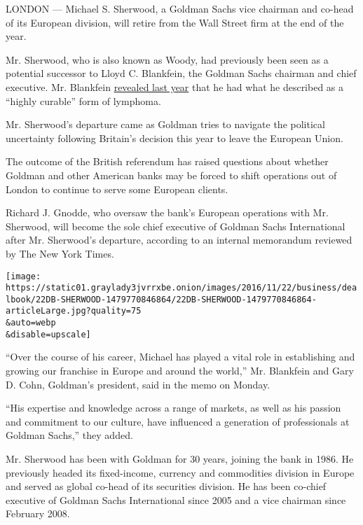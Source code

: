 LONDON --- Michael S. Sherwood, a Goldman Sachs vice chairman and
co-head of its European division, will retire from the Wall Street firm
at the end of the year.

Mr. Sherwood, who is also known as Woody, had previously been seen as a
potential successor to Lloyd C. Blankfein, the Goldman Sachs chairman
and chief executive. Mr. Blankfein
\href{http://www.nytimes3xbfgragh.onion/2015/09/23/business/dealbook/goldman-ceo-lloyd-blankfein-has-lymphoma.html?rref=collection\%2Ftimestopic\%2FBlankfein\%2C\%20Lloyd\%20C.\&action=click\&contentCollection=timestopics\&region=stream\&module=stream_unit\&version=latest\&contentPlacement=8\&pgtype=collection}{revealed
last year} that he had what he described as a ``highly curable'' form of
lymphoma.

Mr. Sherwood's departure came as Goldman tries to navigate the political
uncertainty following Britain's decision this year to leave the European
Union.

The outcome of the British referendum has raised questions about whether
Goldman and other American banks may be forced to shift operations out
of London to continue to serve some European clients.

Richard J. Gnodde, who oversaw the bank's European operations with Mr.
Sherwood, will become the sole chief executive of Goldman Sachs
International after Mr. Sherwood's departure, according to an internal
memorandum reviewed by The New York Times.

\texttt{[image: https://static01.graylady3jvrrxbe.onion/images/2016/11/22/business/dealbook/22DB-SHERWOOD-1479770846864/22DB-SHERWOOD-1479770846864-articleLarge.jpg?quality=75\\\&auto=webp\\\&disable=upscale]}

``Over the course of his career, Michael has played a vital role in
establishing and growing our franchise in Europe and around the world,''
Mr. Blankfein and Gary D. Cohn, Goldman's president, said in the memo on
Monday.

``His expertise and knowledge across a range of markets, as well as his
passion and commitment to our culture, have influenced a generation of
professionals at Goldman Sachs,'' they added.

Mr. Sherwood has been with Goldman for 30 years, joining the bank in
1986. He previously headed its fixed-income, currency and commodities
division in Europe and served as global co-head of its securities
division. He has been co-chief executive of Goldman Sachs International
since 2005 and a vice chairman since February 2008.

